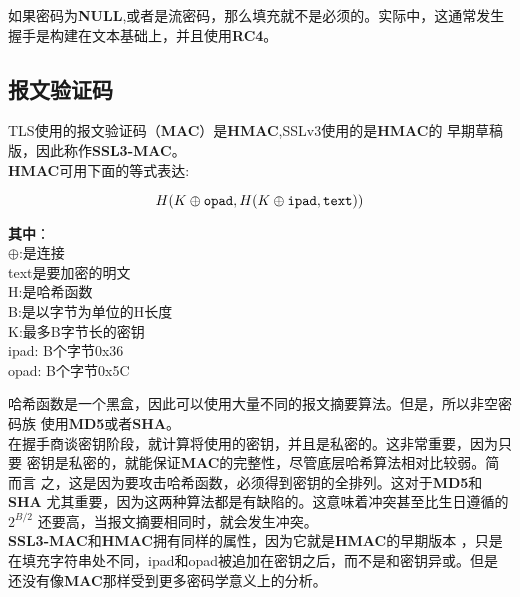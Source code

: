 \documentclass[11pt,dvips]{article}
\begin{document}
如果密码为{\bf{NULL}},或者是流密码，那么填充就不是必须的。实际中，这通常发生
握手是构建在文本基础上，并且使用{\bf{RC4}}。\\


\subsection{报文验证码}

TLS使用的报文验证码（{\bf{MAC}}）是{\bf{HMAC}},SSLv3使用的是{\bf{HMAC}}的
早期草稿版，因此称作{\bf{SSL3-MAC}}。\\

{\bf{HMAC}}可用下面的等式表达:

\begin{displaymath}
        H(K \oplus {\tt{opad}},H(K \oplus {\tt{ipad}},{\tt{text}}))\\{}
 \end{displaymath}

 \begin{center}
         \begin{minipage}[t]{0.30\textwidth}
                 {\bf{其中}}：\\

        $\oplus$:是连接\\
        text是要加密的明文\\
        H:是哈希函数\\
        B:是以字节为单位的H长度\\
        K:最多B字节长的密钥\\
        ipad:   B个字节0x36\\
        opad:   B个字节0x5C\\
\end{minipage}
\end{center}


哈希函数是一个黑盒，因此可以使用大量不同的报文摘要算法。但是，所以非空密码族
使用{\bf{MD5}}或者{\bf{SHA}}。\\

在握手商谈密钥阶段，就计算将使用的密钥，并且是私密的。这非常重要，因为只要
密钥是私密的，就能保证{\bf{MAC}}的完整性，尽管底层哈希算法相对比较弱。简而言
之，这是因为要攻击哈希函数，必须得到密钥的全排列。这对于{\bf{MD5}}和{\bf{SHA}}
尤其重要，因为这两种算法都是有缺陷的。这意味着冲突甚至比生日遵循的$2^{B/2}$
还要高，当报文摘要相同时，就会发生冲突。\\

{\bf{SSL3-MAC}}和{\bf{HMAC}}拥有同样的属性，因为它就是{\bf{HMAC}}的早期版本
，只是在填充字符串处不同，ipad和opad被追加在密钥之后，而不是和密钥异或。但是
还没有像{\bf{MAC}}那样受到更多密码学意义上的分析。 \\
\end{document}
